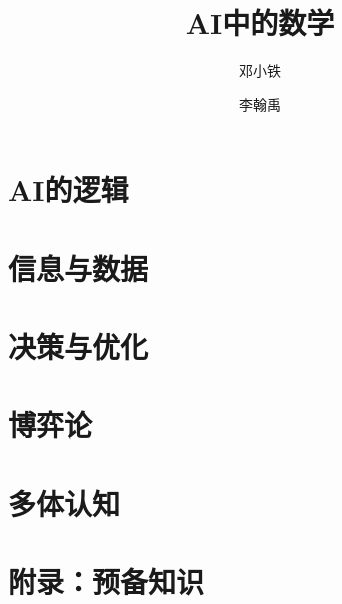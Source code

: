 \documentclass[10pt,oneside,fontset=none]{ctexbook}
\title{AI中的数学}
\author{邓小铁}
\author{李翰禹}
\affil{}
\date{\lastcompiled}
\begin{document}
\frontmatter
\maketitle

\tableofcontents

\mainmatter



\part{AI的逻辑}\label{part:AI-logic}



\part{信息与数据}\label{part:information-data}




\part{决策与优化}\label{part:decision-optimization}




\part{博弈论}\label{part:logic-game}


\part{多体认知}\label{part:cognitive-logic}



\appendix
\part{附录：预备知识}




\backmatter
{}


\end{document}
